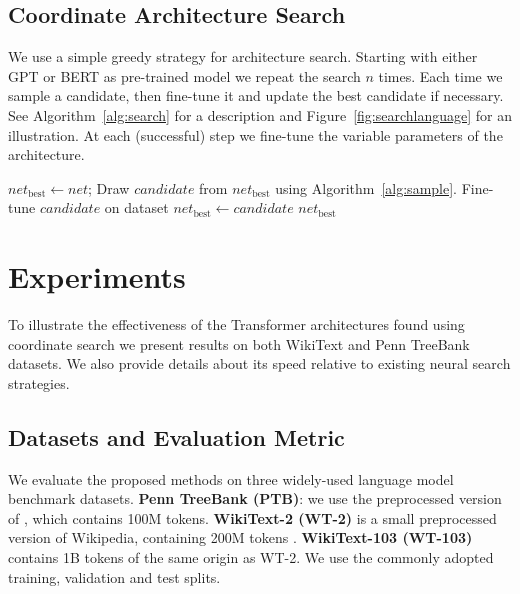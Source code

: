 \documentclass[11pt,a4paper]{article}
\begin{document}
\subsection{Coordinate Architecture Search}

We use a simple greedy strategy for architecture search. Starting with either
GPT or BERT as pre-trained model we repeat the search $n$ times. Each
time we sample a candidate, then fine-tune it and update the best
candidate if necessary. See Algorithm~\ref{alg:search} for a
description and Figure~\ref{fig:searchlanguage} for an
illustration. At each (successful) step we fine-tune the variable
parameters of the architecture. 

\begin{algorithm}[tb]
\caption{\label{alg:search}{Coordinate Architecture Search}}
\begin{algorithmic}[1]
\STATE $\mathit{net}_\mathrm{best} \leftarrow \mathit{net}$;
\STATE Draw $\mathit{candidate}$ from $\mathit{net}_\mathrm{best}$ using Algorithm~\ref{alg:sample}.
\STATE Fine-tune $candidate$ on dataset
\STATE $\mathit{net}_\mathrm{best} \gets \mathit{candidate}$
\ENDIF
\ENDFOR
\RETURN $\mathit{net}_\mathrm{best}$
\end{algorithmic}
\end{algorithm}

 \section{Experiments}
\label{sec:exp}

To illustrate the effectiveness of the Transformer architectures found using coordinate search we present results on both WikiText and Penn TreeBank datasets. We also provide details about its speed relative to existing neural search strategies. 

\subsection{Datasets and Evaluation Metric}

We evaluate the proposed methods on three widely-used language model
benchmark datasets. {\bf Penn TreeBank (PTB)}: we use the preprocessed
version of \cite{mikolov2010recurrent}, which contains 100M
tokens. {\bf WikiText-2 (WT-2)} is a small preprocessed version of
Wikipedia, containing 200M tokens \cite{MerityXBS16}. {\bf
  WikiText-103 (WT-103)} contains 1B tokens of the same origin as
WT-2. We use the commonly adopted training, validation and test
splits.
\end{document}
